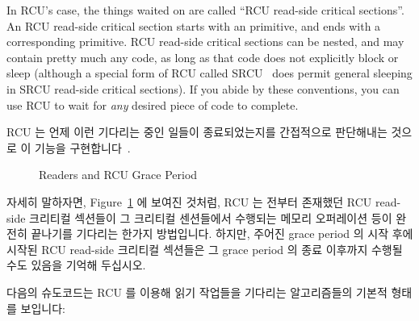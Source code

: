 In RCU's case, the things waited on are called
``RCU read-side critical sections''.
An RCU read-side critical section starts with an
 primitive, and ends with a corresponding
 primitive.
RCU read-side critical sections can be nested, and may contain pretty
much any code, as long as that code does not explicitly block or sleep
(although a special form of RCU called SRCU~\cite{PaulEMcKenney2006c}
does permit general sleeping in SRCU read-side critical sections).
If you abide by these conventions, you can use RCU to wait for \emph{any}
desired piece of code to complete.
\fi

RCU 는 언제 이런 기다리는 중인 일들이 종료되었는지를 간접적으로 판단해내는
것으로 이 기능을 구현합니다~\cite{PaulEMcKenney2007whatisRCU,
PaulEMcKenney2007PreemptibleRCU}.

\begin{figure}[tb]
\begin{center}
\end{center}
\caption{Readers and RCU Grace Period}
\label{fig:defer:Readers and RCU Grace Period}
\end{figure}

자세히 말하자면,
Figure~\ref{fig:defer:Readers and RCU Grace Period} 에 보여진 것처럼, RCU 는
전부터 존재했던 RCU read-side 크리티컬 섹션들이 그 크리티컬 센션들에서 수행되는
메모리 오퍼레이션 등이 완전히 끝나기를 기다리는 한가지 방법입니다.
하지만, 주어진 grace period 의 시작 후에 시작된 RCU read-side 크리티컬 섹션들은
그 grace period 의 종료 이후까지 수행될 수도 있음을 기억해 두십시오.

다음의 슈도코드는 RCU 를 이용해 읽기 작업들을 기다리는 알고리즘들의 기본적
형태를 보입니다:

